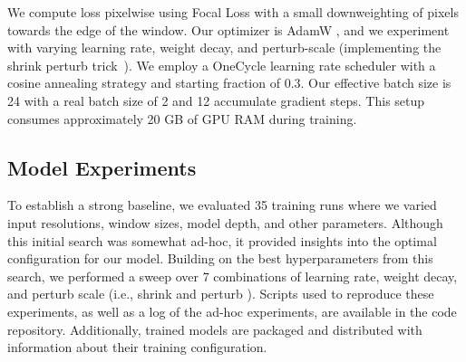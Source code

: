 \documentclass[10pt,twocolumn,letterpaper]{article}
\begin{document}
We compute loss pixelwise using Focal Loss \cite{ross2017focal} with a small downweighting of pixels towards
  the edge of the window.
Our optimizer is AdamW \cite{loshchilov_decoupled_2018}, and we experiment with varying learning rate,
  weight decay, and perturb-scale (implementing the shrink perturb trick~\cite{ash_warm_starting_2020,dohare_loss_2023}).
We employ a OneCycle learning rate scheduler \cite{smith2019super} with a cosine annealing strategy and
  starting fraction of 0.3.
Our effective batch size is 24 with a real batch size of 2 and 12 accumulate gradient steps.
This setup consumes approximately 20 GB of GPU RAM during training.
  

\subsection{Model Experiments}


To establish a strong baseline, we evaluated 35 training runs where we varied input resolutions, window
  sizes, model depth, and other parameters.
Although this initial search was somewhat ad-hoc, it provided insights into the optimal configuration for
  our model.
Building on the best hyperparameters from this search, we performed a sweep over 7 combinations of learning
  rate, weight decay, and perturb scale (i.e., shrink and perturb \cite{ash_warm_starting_2020,dohare_loss_2023}).
Scripts used to reproduce these experiments, as well as a log of the ad-hoc experiments, are available in
  the code repository.
Additionally, trained models are packaged and distributed with information about their training
  configuration.
\end{document}
